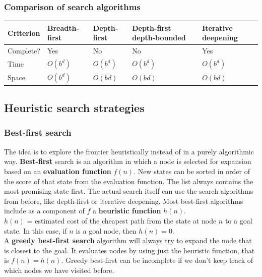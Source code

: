 \documentclass{article}
\newcommand{\n}[0]{\\[\baselineskip]}
\begin{document}
\subsubsection{Comparison of search algorithms}

\begin{tabularx}{\textwidth}{|X|XXXX|}
\hline
Criterion & Breadth-first & Depth-first & Depth-first depth-bounded & Iterative deepening \\
\hline
Complete? & Yes & No & No & Yes \\
Time & $O(b^{d})$ & $O(b^{d})$ & $O(b^{d})$ & $O(b^{d})$ \\
Space & $O(b^{d})$ & $O(bd)$ & $O(bd)$ & $O(bd)$ \\
\hline
\end{tabularx}

\subsection{Heuristic search strategies}
\subsubsection{Best-first search}
The idea is to explore the frontier heuristically instead of in a purely algorithmic way. \textbf{Best-first} search is an algorithm in which a node is selected for expansion based on an \textbf{evaluation function} $f(n)$. New states can be sorted in order of the score of that state from the evaluation function. The list always contains the most promising state first. The actual search itself can use the search algorithms from before, like depth-first or iterative deepening. Most best-first algorithms include as a component of $f$ a \textbf{heuristic function} $h(n)$.
\n
$h(n)$ = estimated cost of the cheapest path from the state at node $n$ to a goal state. In this case, if $n$ is a goal node, then $h(n) = 0$.
\n
A \textbf{greedy best-first search} algorithm will always try to expand the node that is closest to the goal. It evaluates nodes by using just the heuristic function, that is $f(n) = h(n)$.  Greedy best-first can be incomplete if we don't keep track of which nodes we have visited before. 
\end{document}
